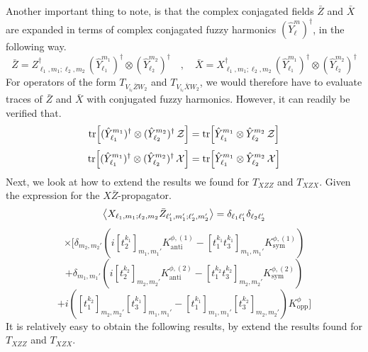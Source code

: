 Another important thing to note, is that the complex conjagated fields $\bar{Z}$ and $\bar{X}$ are expanded in terms of complex conjagated fuzzy harmonics $(\hat{Y}^{m}_{\ell})^\dagger$, in the following way.
%
%
\begin{equation}
\bar{Z} = Z^\dagger_{\ell_1, m_1; \ell_2, m_2} \, (\hat{Y}^{m_1}_{\ell_1})^\dagger \otimes (\hat{Y}^{m_2}_{\ell_2})^\dagger
%
\quad , \quad
%
\bar{X} = X^\dagger_{\ell_1, m_1; \ell_2, m_2} \, (\hat{Y}^{m_1}_{\ell_1})^\dagger \otimes (\hat{Y}^{m_2}_{\ell_2})^\dagger
\end{equation}
%
%
For operators of the form $T_{V_{i_\ell} \bar{Z} W_2}$ and $T_{V_{i_\ell} \bar{X} W_2}$, we would therefore have to evaluate traces of $\bar{Z}$ and $\bar{X}$ with conjugated fuzzy harmonics. However, it can readily be verified that.
%
%
\begin{equation}
\tr[ (\hat{Y}^{m_1}_{\ell_1})^\dagger \otimes (\hat{Y}^{m_2}_{\ell_2})^\dagger \, \mathcal{Z}]
=
\tr[ \hat{Y}^{m_1}_{\ell_1} \otimes \hat{Y}^{m_2}_{\ell_2} \, \mathcal{Z}]
\end{equation}
%
%
\begin{equation}
\tr[ (\hat{Y}^{m_1}_{\ell_1})^\dagger \otimes (\hat{Y}^{m_2}_{\ell_2})^\dagger \, \mathcal{X}]
=
\tr[ \hat{Y}^{m_1}_{\ell_1} \otimes \hat{Y}^{m_2}_{\ell_2} \, \mathcal{X}]
\end{equation}
%
%
Next, we look at how to extend the results we found for $T_{XZZ}$ and $T_{XZX}$. Given the expression for the $X \bar{Z}$-propagator.
%
%
\begin{equation*}
\expval{
X_{\ell_1,m_1;\ell_2,m_2}
\bar{Z}_{\ell_1',m_1';\ell_2',m_2'}
}
=
\delta_{\ell_1 \ell_1'} \delta_{\ell_2 \ell_2'}
\end{equation*}
%
%
\begin{equation*}
\times
\Bigg[
\delta_{m_2, m_2'}
\left(
i [t_2^{k_1}]_{m_1,m_1'} K^{\phi,(1)}_{\text{anti}}
- [t_1^{k_1} t_3^{k_1}]_{m_1,m_1'} K^{\phi,(1)}_{\text{sym}}
\right)
\end{equation*}
%
%
\begin{equation*}
+ \delta_{m_1, m_1'}
\left(
i [t_2^{k_2}]_{m_2,m_2'} K^{\phi,(2)}_{\text{anti}}
- [t_1^{k_2} t_3^{k_2}]_{m_2,m_2'} K^{\phi,(2)}_{\text{sym}}
\right)
\end{equation*}
%
%
\begin{equation}
+ i \left(
[t_1^{k_2}]_{m_2,m_2'} [t_3^{k_1}]_{m_1,m_1'}
-
[t_1^{k_1}]_{m_1,m_1'} [t_3^{k_2}]_{m_2,m_2'}
\right)
K^{\phi}_{\text{opp}}
\Bigg]
\end{equation}
%
%
It is relatively easy to obtain the following results, by extend the results found for $T_{XZZ}$ and $T_{XZX}$.

